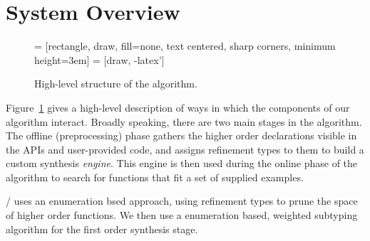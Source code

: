 \section{System Overview}

\begin{figure}[t]
  \centering
     = [rectangle, draw, fill=none,
    text centered, sharp corners, minimum height=3em]
 = [draw, -latex']

  \caption{High-level structure of the algorithm.}
  \label{fig:high_level_overview}
\end{figure}


Figure~\ref{fig:high_level_overview} gives a high-level description of ways in which the components of our algorithm interact. Broadly speaking, there are two main stages in the algorithm. The offline (preprocessing) phase gathers the higher order declarations visible in the APIs and user-provided code, and assigns refinement types to them to build a custom synthesis \textit{engine}. This engine is then used during the online phase of the algorithm to search for functions that fit a set of supplied examples.

\ourTool/ uses an enumeration bsed approach, using refinement types to prune the space of higher order functions.
We then use a enumeration based, weighted subtyping algorithm for the first order synthesis stage.

